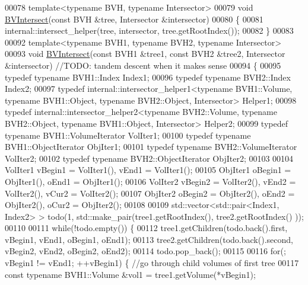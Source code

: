 \begin{DoxyCode}
00078 \textcolor{keyword}{template}<\textcolor{keyword}{typename} BVH, \textcolor{keyword}{typename} Intersector>
00079 \textcolor{keywordtype}{void} \hyperlink{namespace_eigen_a07d8e283f082c972338f3fc4f644b2a9}{BVIntersect}(\textcolor{keyword}{const} BVH &tree, Intersector &intersector)
00080 \{
00081   internal::intersect\_helper(tree, intersector, tree.getRootIndex());
00082 \}
00083 
00092 \textcolor{keyword}{template}<\textcolor{keyword}{typename} BVH1, \textcolor{keyword}{typename} BVH2, \textcolor{keyword}{typename} Intersector>
00093 \textcolor{keywordtype}{void} \hyperlink{namespace_eigen_a07d8e283f082c972338f3fc4f644b2a9}{BVIntersect}(\textcolor{keyword}{const} BVH1 &tree1, \textcolor{keyword}{const} BVH2 &tree2, Intersector &intersector) \textcolor{comment}{//TODO: tandem
       descent when it makes sense}
00094 \{
00095   \textcolor{keyword}{typedef} \textcolor{keyword}{typename} BVH1::Index Index1;
00096   \textcolor{keyword}{typedef} \textcolor{keyword}{typename} BVH2::Index Index2;
00097   \textcolor{keyword}{typedef} internal::intersector\_helper1<typename BVH1::Volume, typename BVH1::Object, typename
       BVH2::Object, Intersector> Helper1;
00098   \textcolor{keyword}{typedef} internal::intersector\_helper2<typename BVH2::Volume, typename BVH2::Object, typename
       BVH1::Object, Intersector> Helper2;
00099   \textcolor{keyword}{typedef} \textcolor{keyword}{typename} BVH1::VolumeIterator VolIter1;
00100   \textcolor{keyword}{typedef} \textcolor{keyword}{typename} BVH1::ObjectIterator ObjIter1;
00101   \textcolor{keyword}{typedef} \textcolor{keyword}{typename} BVH2::VolumeIterator VolIter2;
00102   \textcolor{keyword}{typedef} \textcolor{keyword}{typename} BVH2::ObjectIterator ObjIter2;
00103 
00104   VolIter1 vBegin1 = VolIter1(), vEnd1 = VolIter1();
00105   ObjIter1 oBegin1 = ObjIter1(), oEnd1 = ObjIter1();
00106   VolIter2 vBegin2 = VolIter2(), vEnd2 = VolIter2(), vCur2 = VolIter2();
00107   ObjIter2 oBegin2 = ObjIter2(), oEnd2 = ObjIter2(), oCur2 = ObjIter2();
00108 
00109   std::vector<std::pair<Index1, Index2> > todo(1, std::make\_pair(tree1.getRootIndex(), tree2.getRootIndex()
      ));
00110 
00111   \textcolor{keywordflow}{while}(!todo.empty()) \{
00112     tree1.getChildren(todo.back().first, vBegin1, vEnd1, oBegin1, oEnd1);
00113     tree2.getChildren(todo.back().second, vBegin2, vEnd2, oBegin2, oEnd2);
00114     todo.pop\_back();
00115 
00116     \textcolor{keywordflow}{for}(; vBegin1 != vEnd1; ++vBegin1) \{ \textcolor{comment}{//go through child volumes of first tree}
00117       \textcolor{keyword}{const} \textcolor{keyword}{typename} BVH1::Volume &vol1 = tree1.getVolume(*vBegin1);

\end{DoxyCode}
